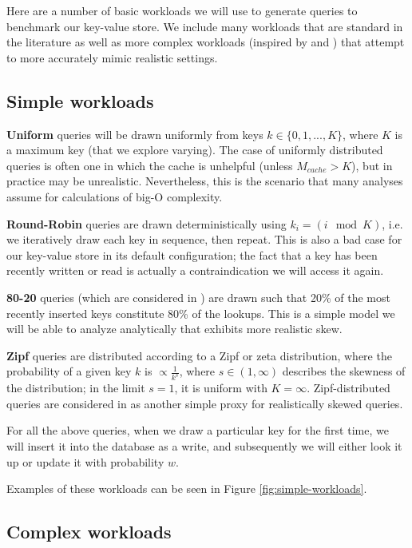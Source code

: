 \documentclass{sig-alternate-05-2015}
\begin{document}
Here are a number of basic workloads we will use to generate queries to
benchmark our key-value store. We include many workloads that are standard in
the literature as well as more complex workloads (inspired by
\cite{characterizing-memcached} and \cite{linkbench}) that attempt to more
accurately mimic realistic settings.

\subsection{Simple workloads}

\textbf{Uniform} queries will be drawn uniformly from keys $k \in
\{0,1,...,K\}$, where $K$ is a maximum key (that we explore varying).
The case of uniformly distributed queries is often one in
which the cache is unhelpful (unless $M_{cache} > K$), but in practice may be
unrealistic. Nevertheless, this is the scenario that many analyses assume for
calculations of big-O complexity.

\textbf{Round-Robin} queries are drawn deterministically using $k_i = (i \mod
K)$, i.e. we iteratively draw each key in sequence, then repeat.
This is also a bad case for our key-value store in its default configuration;
the fact that a key has been recently written or read is actually a
contraindication we will access it again.

\textbf{80-20} queries (which are considered in \cite{monkey}) are drawn such
that 20\% of the most recently inserted keys constitute 80\% of the lookups.
This is a simple model we will be able to analyze analytically that exhibits
more realistic skew.

\textbf{Zipf} queries are distributed according to a Zipf or zeta distribution,
where the probability of a given key $k$ is $\propto \frac{1}{k^s}$, where $s
\in (1, \infty)$ describes the skewness of the distribution; in the limit
$s=1$, it is uniform with $K=\infty$. Zipf-distributed queries are considered
in \cite{art} as another simple proxy for realistically skewed queries.

For all the above queries, when we draw a particular key for the first time, we
will insert it into the database as a write, and subsequently we will either
look it up or update it with probability $w$.

Examples of these workloads can be seen in Figure \ref{fig:simple-workloads}.

\subsection{Complex workloads}
\end{document}
